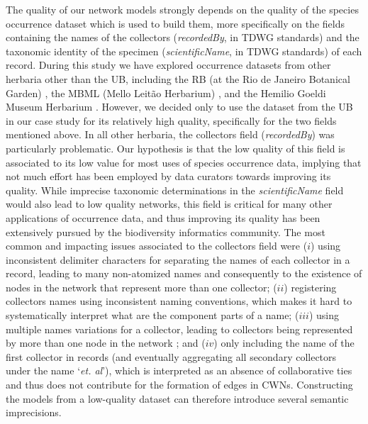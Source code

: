 The quality of our network models strongly depends on the quality of the species occurrence dataset which is used to build them, more specifically on the fields containing the names of the collectors (\textit{recordedBy}, in TDWG standards) and the taxonomic identity of the specimen (\textit{scientificName}, in TDWG standards) of each record.
%
During this study we have explored occurrence datasets from other herbaria other than the UB, including
the RB (at the Rio de Janeiro Botanical Garden) \cite{gbif_rb}, 
the MBML (Mello Leitão Herbarium) \cite{gbif_mbml},
and the Hemilio Goeldi Museum Herbarium \cite{gbif_mpegh}.
However, we decided only to use the dataset from the UB in our case study for its relatively high quality, specifically for the two fields mentioned above.
%
In all other herbaria, the collectors field (\textit{recordedBy}) was particularly problematic.
Our hypothesis is that the low quality of this field is associated to its low value for most uses of species occurrence data, implying that not much effort has been employed by data curators towards improving its quality.
While imprecise taxonomic determinations in the \textit{scientificName} field would also lead to low quality networks, this field is critical for many other applications of occurrence data, and thus improving its quality has been extensively pursued by the biodiversity informatics community.
The most common and impacting issues associated to the collectors field were 
($i$) using inconsistent delimiter characters for separating the names of each collector in a record, leading to many non-atomized names and consequently to the existence of nodes in the network that represent more than one collector; 
($ii$) registering collectors names using inconsistent naming conventions, which makes it hard to systematically interpret what are the component parts of a name; 
($iii$) using multiple names variations for a collector, leading to collectors being represented by more than one node in the network ; and 
($iv$) only including the name of the first collector in records (and eventually aggregating all secondary collectors under the name `\textit{et. al}'), which is interpreted as an absence of collaborative ties and thus does not contribute for the formation of edges in CWNs.
Constructing the models from a low-quality dataset can therefore introduce several semantic imprecisions. 


